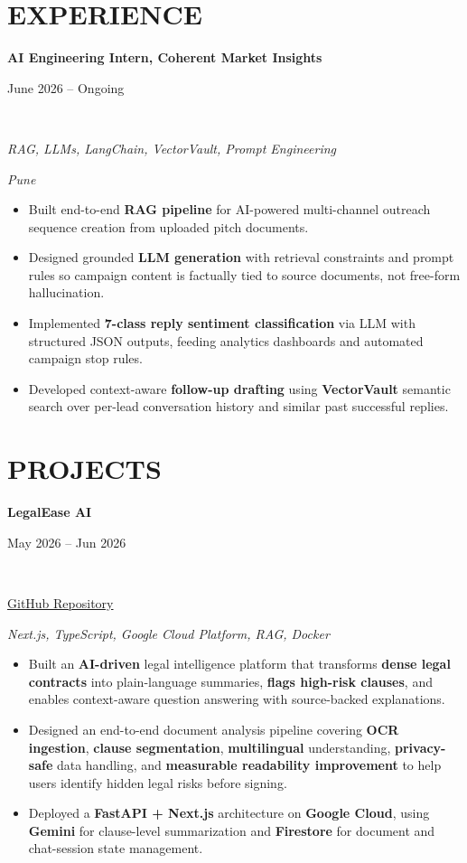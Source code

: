 \documentclass[letterpaper,9pt]{article}
\newcommand{\secgap}{\vspace{4pt}}
\newcommand{\headgap}{\vspace{2pt}}
\newcommand{\bulletgap}{\vspace{1pt}}
\newcommand{\resumeSubheading}[4]{
    \parbox[t]{0.68\textwidth}{\textbf{\small #1}}\hfill\parbox[t]{0.3\textwidth}{\raggedleft\small #2}\\
    \parbox[t]{0.68\textwidth}{\textit{\footnotesize #3}}\hfill\parbox[t]{0.3\textwidth}{\raggedleft\textit{\footnotesize #4}}
}
\newcommand{\resumeProject}[4]{
    \parbox[t]{0.68\textwidth}{\textbf{\small #1}}\hfill\parbox[t]{0.3\textwidth}{\raggedleft\small #2}\\
    \parbox[t]{0.68\textwidth}{\footnotesize #3}\hfill\parbox[t]{0.3\textwidth}{\raggedleft\textit{\footnotesize #4}}
}
\begin{document}
\section{EXPERIENCE}
\headgap
\resumeSubheading
{AI Engineering Intern, Coherent Market Insights} {June 2026 -- Ongoing} {RAG, LLMs, LangChain, VectorVault, Prompt Engineering}{Pune}
\headgap
\begin{itemize}
    \item \footnotesize Built end-to-end \textbf{RAG pipeline} for AI-powered multi-channel outreach sequence creation from uploaded pitch documents.
    \bulletgap
    \item \footnotesize Designed grounded \textbf{LLM generation} with retrieval constraints and prompt rules so campaign content is factually tied to source documents, not free-form hallucination.
    \bulletgap
    \item \footnotesize Implemented \textbf{7-class reply sentiment classification} via LLM with structured JSON outputs, feeding analytics dashboards and automated campaign stop rules.
    \bulletgap
    \item \footnotesize Developed context-aware \textbf{follow-up drafting} using \textbf{VectorVault} semantic search over per-lead conversation history and similar past successful replies.
\end{itemize}

\secgap
\section{PROJECTS}
\headgap
\resumeProject{LegalEase AI}{May 2026 -- Jun 2026}
{\href{https://github.com/aman2225/legalease_ai}{\color{linkcolor}GitHub Repository}}{\textit{Next.js, TypeScript, Google Cloud Platform, RAG, Docker}}
\headgap
\begin{itemize}
    \item \footnotesize Built an \textbf{AI-driven} legal intelligence platform that transforms \textbf{dense legal contracts} into plain-language summaries, \textbf{flags high-risk clauses}, and enables context-aware question answering with source-backed explanations.
    \bulletgap
    \item \footnotesize Designed an end-to-end document analysis pipeline covering \textbf{OCR ingestion}, \textbf{clause segmentation}, \textbf{multilingual} understanding, \textbf{privacy-safe} data handling, and \textbf{measurable readability improvement} to help users identify hidden legal risks before signing.
    \bulletgap
    \item \footnotesize Deployed a \textbf{FastAPI + Next.js} architecture on \textbf{Google Cloud}, using \textbf{Gemini} for clause-level summarization and \textbf{Firestore} for document and chat-session state management.
\end{itemize}
\end{document}
